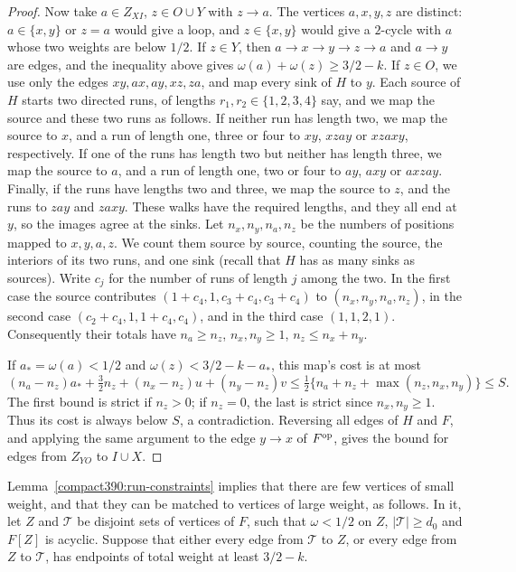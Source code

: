\begin{proof}
Now take $a\in Z_{XI}$, $z\in O\cup Y$ with $z\to a$.
The vertices $a,x,y,z$ are distinct: $a\in\{x,y\}$ or $z=a$ would give
a loop, and $z\in\{x,y\}$ would give a $2$-cycle with $a$ whose two weights are below $1/2$.
If $z\in Y$, then $a\to x\to y\to z\to a$ and $a\to y$ are edges, and the inequality above gives
$\omega(a)+\omega(z)\ge3/2-k$.
If $z\in O$, we use only the edges $xy,ax,ay,xz,za$,
and map every sink of $H$ to $y$.
Each source of $H$ starts two directed runs, of lengths $r_1,r_2\in\{1,2,3,4\}$ say, and we map the source and these two runs as follows. If neither run has length two, we map the source to $x$, and a run of length one, three or four to $xy$, $xzay$ or $xzaxy$, respectively. If one of the runs has length two but neither has length three, we map the source to $a$, and a run of length one, two or four to $ay$, $axy$ or $axzay$. Finally, if the runs have lengths two and three, we map the source to $z$, and the runs to $zay$ and $zaxy$.
These walks have the required lengths, and they all end at $y$, so the images agree at the sinks.
Let $n_x,n_y,n_a,n_z$ be the numbers of positions mapped to $x,y,a,z$. We count them source by source, counting the source, the interiors of its two runs, and one sink (recall that $H$ has as many sinks as sources). Write $c_j$ for the number of runs of length $j$ among the two. In the first case the source contributes
$(1+c_4,1,c_3+c_4,c_3+c_4)$ to $(n_x,n_y,n_a,n_z)$, in the second case
$(c_2+c_4,1,1+c_4,c_4)$, and in the third case $(1,1,2,1)$.
Consequently their totals have
$n_a\ge n_z$, $n_x,n_y\ge1$, $n_z\le n_x+n_y$.

If $a_*=\omega(a)<1/2$ and
$\omega(z)<3/2-k-a_*$, this map's cost is at most
\[
 (n_a-n_z)a_*+\tfrac32n_z
                  +(n_x-n_z)u+(n_y-n_z)v
 \le\tfrac12\{n_a+n_z+\max(n_z,n_x,n_y)\}\le S.
\]
The first bound is strict if $n_z>0$; if $n_z=0$,
the last is strict since $n_x,n_y\ge1$. Thus its cost is
always below $S$, a contradiction.
Reversing all edges of $H$ and $F$, and applying the same argument to the edge $y\to x$ of $F^{\rm op}$,
gives the bound for edges from $Z_{YO}$ to $I\cup X$.
\end{proof}

Lemma~\ref{compact390:run-constraints} implies that there are few vertices of small weight, and that they can be matched to vertices of large weight, as follows. In it, let $Z$ and $\mathcal T$ be disjoint sets of vertices of $F$, such that $\omega<1/2$ on $Z$, $|\mathcal T|\ge d_0$ and $F[Z]$ is acyclic.
Suppose that either every edge from $\mathcal T$ to $Z$, or every edge from $Z$ to $\mathcal T$, has endpoints of total weight at least $3/2-k$.

